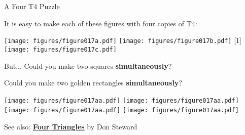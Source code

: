 \documentclass[14pt]{beamer}
\begin{document}

    \begin{frame}{A Four T4 Puzzle}
        \begin{center}
            {\small It is easy to make each of these figures with four copies of T4:}

            \bigskip\medskip

            \texttt{[image: figures/figure017a.pdf]}\qquad
            \texttt{[image: figures/figure017b.pdf]}\quad\!
            \scalebox{-1}[1]{\texttt{[image: figures/figure017c.pdf]}}

            \bigskip\medskip

            {\small But... Could you make two squares \textbf{simultaneously}?\smallskip

            Could you make two golden rectangles \textbf{simultaneously}?}\bigskip\medskip

            \texttt{[image: figures/figure017aa.pdf]}\qquad
            \texttt{[image: figures/figure017aa.pdf]}\qquad
            \texttt{[image: figures/figure017aa.pdf]}\qquad
            \texttt{[image: figures/figure017aa.pdf]}\bigskip

            {\footnotesize See also: \textbf{\href{donsteward.blogspot.com.es/2012/03/four-triangles.html}{Four Triangles}} by Don Steward}
        \end{center}
    \end{frame}

\end{document}
